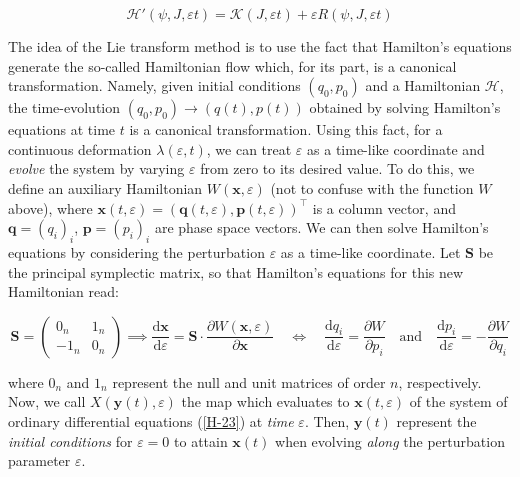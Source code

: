 \begin{equation*}
    \mathcal{H}'(\psi, J, \varepsilon t) = \mathcal{K}(J,\varepsilon t) + \varepsilon R(\psi, J,\varepsilon t)
\end{equation*}

The idea of the Lie transform method is to use the fact that Hamilton's equations generate the so-called Hamiltonian flow which, for its part, is a canonical transformation. Namely, given initial conditions $(q_0,p_0)$ and a Hamiltonian $\mathcal{H}$, the time-evolution $(q_0,p_0)\to(q(t),p(t))$ obtained by solving Hamilton's equations at time $t$ is a canonical transformation. Using this fact, for a continuous deformation $\lambda(\varepsilon, t)$, we can treat $\varepsilon$ as a time-like coordinate and \textit{evolve} the system by varying $\varepsilon$ from zero to its desired value. To do this, we define an auxiliary Hamiltonian $W(\mathbf{x},\varepsilon)$ (not to confuse with the function $W$ above), where $\mathbf{x}(t,\varepsilon)=(\mathbf{q}(t,\varepsilon),\mathbf{p}(t,\varepsilon))^\top$ is a column vector, and $\mathbf{q}=(q_i)_{i}$, $\mathbf{p}=(p_i)_i$ are phase space vectors. We can then solve Hamilton's equations by considering the perturbation $\varepsilon$ as a time-like coordinate. Let $\mathbf{S}$ be the principal symplectic matrix, so that Hamilton's equations for this new Hamiltonian read:

\begin{equation}
    \label{H-23}
    \mathbf{S}=\begin{pmatrix}
        0_n & 1_n\\ -1_n & 0_n
    \end{pmatrix}\implies\frac{\mathrm{d}\mathbf{x}}{\mathrm{d}\varepsilon}=\mathbf{S}\cdot \frac{\partial W(\mathbf{x},\varepsilon)}{\partial \mathbf{x}}\quad\Longleftrightarrow\quad \frac{\mathrm{d}q_i}{\mathrm{d}\varepsilon}=\frac{\partial W}{\partial p_i}\quad\text{and}\quad \frac{\mathrm{d}p_i}{\mathrm{d}\varepsilon}=-\frac{\partial W}{\partial q_i}
\end{equation}

where $0_n$ and $1_n$ represent the null and unit matrices of order $n$, respectively. Now, we call $X(\mathbf{y}(t),\varepsilon)$ the map which evaluates to $\mathbf{x}(t,\varepsilon)$ of the system of ordinary differential equations (\ref{H-23}) at \textit{time} $\varepsilon$. Then, $\mathbf{y}(t)$ represent the \textit{initial conditions} for $\varepsilon=0$ to attain $\mathbf{x}(t)$ when evolving \textit{along} the perturbation parameter $\varepsilon$. 

